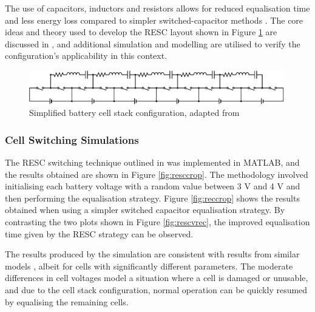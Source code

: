 The use of capacitors, inductors and resistors allows for reduced equalisation time and less energy loss compared to simpler switched-capacitor methods \cite{8467638}. The core ideas and theory used to develop the \gls{RESC} layout shown in Figure \ref{fig:bcs} are discussed in \cite{8681672}, and additional simulation and modelling are utilised to verify the configuration's applicability in this context.

\begin{figure}[H]
\centering
\vspace{10mm}
\includegraphics[width=0.99\textwidth]{figs/Samuel/Figures/resc1-cropped.pdf}
\caption[Simplified Battery Cell Stack Configuration]{Simplified battery cell stack configuration, adapted from \cite{8467638}}
\label{fig:bcs}
\end{figure}

\subsubsection{Cell Switching Simulations}
\label{swit}

The \gls{RESC} switching technique outlined in \cite{8467638} was implemented in MATLAB, and the results obtained are shown in Figure \ref{fig:resccrop}. The methodology involved initialising each battery voltage with a random value between 3 V and 4 V and then performing the equalisation strategy. Figure \ref{fig:reccrop} shows the results obtained when using a simpler switched capacitor equalisation strategy. By contrasting the two plots shown in Figure \ref{fig:rescvrec}, the improved equalisation time given by the \gls{RESC} strategy can be observed. 

The results produced by the simulation are consistent with results from similar models \cite{8467638}, albeit for cells with significantly different parameters. The moderate differences in cell voltages model a situation where a cell is damaged or unusable, and due to the cell stack configuration, normal operation can be quickly resumed by equalising the remaining cells.

